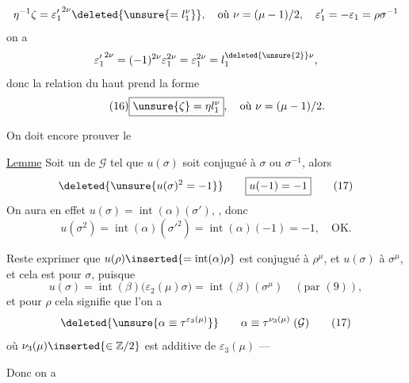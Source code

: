 
\[
\eta^{-1}\zeta={\varepsilon'_1}^{2\nu}\deleted{\unsure{=l_1^\nu}},
\quad\text{où }\nu=(\mu-1)/2,\quad\varepsilon'_1=-\varepsilon_1=\rho\sigma^{-1}
\]
on a
\[
{\varepsilon'_1}^{2\nu}=(-1)^{2\nu}\varepsilon_1^{2\nu}
=\varepsilon_1^{2\nu}=l_1^{\deleted{\unsure{2}}\nu},
\]
donc la relation du haut prend la forme
\[
\tag{16}
\boxed{\unsure{\zeta}=\eta l_1^\nu},\quad\text{où }\nu=(\mu-1)/2.
\]

On doit encore prouver le

\uline{Lemme} Soit  un  de $\mathcal{G}$ tel que $u(\sigma)$ soit conjugué  à $\sigma$ ou $\sigma^{-1}$, alors
\[
\deleted{\unsure{u(\sigma)^2=-1}}
\qquad\boxed{u(-1)=-1}
\tag{17}
\]
On aura en effet $u(\sigma)=\operatorname{int}(\alpha)(\sigma')$, , donc
\[
u(\sigma^2)=\operatorname{int}(\alpha)({\sigma'}^2)
=\operatorname{int}(\alpha)(-1)=-1,\quad\text{OK.}
\]

Reste  exprimer  que  $u(\rho)\inserted{=\operatorname{int}(\alpha)\rho}$ est conjugué à $\rho^\mu$, et $u(\sigma)$ à $\sigma^\mu$, et cela est   pour $\sigma$, puisque
\[
u(\sigma)=\operatorname{int}(\beta)\bigl(\varepsilon_2(\mu)\sigma\bigr)
=\operatorname{int}(\beta)(\sigma^\mu)\quad(\text{par }(9)),
\]
et pour $\rho$ cela signifie que l'on a
\[
\deleted{\unsure{\alpha\equiv\tau^{\varepsilon_3(\mu)}}}
\qquad\alpha\equiv\tau^{\nu_3(\mu)}\;(\mathcal{G})
\tag{17}
\]
où $\nu_3(\mu)\inserted{\in\mathbb{Z}/2}$ est   additive de $\varepsilon_3(\mu)$ —

Donc on a 

